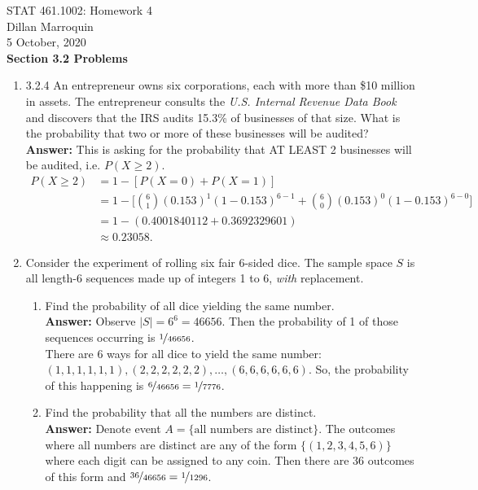 \documentclass{article}
\begin{document}
    \noindent STAT 461.1002: Homework 4\\
    Dillan Marroquin\\
    5 October, 2020\\

    \quad \textbf{Section 3.2 Problems}
    \begin{enumerate}
        \item 3.2.4 An entrepreneur owns six corporations, each with more than \$10 million in assets. The entrepreneur consults the \textit{U.S. Internal Revenue Data Book} and discovers that the IRS audits 15.3\% of businesses of that size. What is the probability that two or more of these businesses will be audited?\\
        \textbf{Answer: }This is asking for the probability that AT LEAST 2 businesses will be audited, i.e. $P(X \geq 2)$.
            \begin{align*}
                P(X \geq 2) &= 1-[P(X = 0)+P(X = 1)]\\
                &= 1-\bigg[{6 \choose 1}(0.153)^1(1-0.153)^{6-1}+{6\choose 0}(0.153)^0(1-0.153)^{6-0}\bigg]\\
                &= 1-(0.4001840112+0.3692329601)\\
                &\approx 0.23058.
            \end{align*}

        \item Consider the experiment of rolling six fair 6-sided dice. The sample space $S$ is all length-6 sequences made up of integers 1 to 6, \textit{with} replacement.   \begin{enumerate}
            \item Find the probability of all dice yielding the same number.\\
            \textbf{Answer: }Observe $|S| = 6^6 = 46656$. Then the probability of 1 of those sequences occurring is $\nicefrac{1}{46656}$.\\
            There are 6 ways for all dice to yield the same number: $(1,1,1,1,1,1),(2,2,2,2,2,2),\ldots,(6,6,6,6,6,6)$. So, the probability of this happening is $\nicefrac{6}{46656} = \nicefrac{1}{7776}$.
                
            \item Find the probability that all the numbers are distinct.\\
            \textbf{Answer: }Denote event $A = \{\text{all numbers are distinct}\}$. The outcomes where all numbers are distinct are any of the form $\{(1,2,3,4,5,6)\}$ where each digit can be assigned to any coin. Then there are 36 outcomes of this form and $\nicefrac{36}{46656} = \nicefrac{1}{1296}$.\\
            \end{enumerate}


\end{enumerate}
\end{document}
